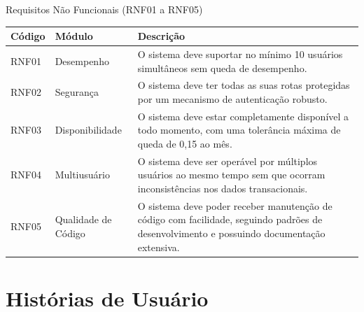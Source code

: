 \documentclass[
	12pt,				%
	openany,			%
	twoside,			%
	a4paper,			%
	english,			%
	brazil				%
	]{abntex2}
\begin{document}
\begin{quadro}[htb]
\caption{\label{quadro_rnf1}Requisitos Não Funcionais (RNF01 a RNF05)}
\begin{center}
\begin{tabular}{|p{2.2cm}|p{4.0cm}|p{10.0cm}|}
    \hline
    \textbf{Código} & \textbf{Módulo} & \textbf{Descrição} \\ \hline
    RNF01 & Desempenho & O sistema deve suportar no mínimo 10 usuários simultâneos sem queda de desempenho. \\ \hline
    RNF02 & Segurança & O sistema deve ter todas as suas rotas protegidas por um mecanismo de autenticação robusto. \\ \hline
    RNF03 & Disponibilidade & O sistema deve estar completamente disponível a todo momento, com uma tolerância máxima de queda de 0,15 ao mês. \\ \hline
    RNF04 & Multiusuário & O sistema deve ser operável por múltiplos usuários ao mesmo tempo sem que ocorram inconsistências nos dados transacionais. \\ \hline
    RNF05 & Qualidade de Código & O sistema deve poder receber manutenção de código com facilidade, seguindo padrões de desenvolvimento e possuindo documentação extensiva. \\ \hline
\end{tabular}
\end{center}
\end{quadro}

\FloatBarrier




\newpage
\section{Histórias de Usuário}
\end{document}
